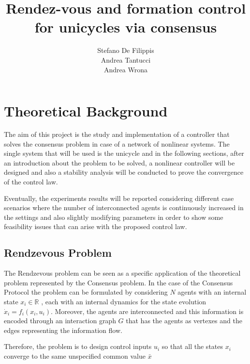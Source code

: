 \documentclass[11pt]{article}
\begin{document}
\title{\textbf{\textcolor{sapred}{Rendez-vous and formation control for unicycles via consensus}}}
\author{Stefano De Filippis \\
Andrea Tantucci \\
Andrea Wrona}
\maketitle

\thispagestyle{empty}

\section*{Theoretical Background}
The aim of this project is the study and implementation of a controller that solves the consensus problem in case of a network of nonlinear systems. The single system that will be used is the unicycle and in the following sections, after an introduction about the problem to be solved, a nonlinear controller will be designed and also a stability analysis will be conducted to prove the convergence of the control law.

Eventually, the experiments results will be reported considering different case scenarios where the number of interconnected agents is continuously increased in the settings and also slightly modifying parameters in order to show some feasibility issues that can arise with the proposed control law.

\subsection*{Rendzevous Problem}

The Rendzevous problem can be seen as a specific application of the theoretical problem represented by the Consensus problem. In the case of the Consensus Protocol the problem can be formulated by considering $N$ agents with an internal state $x_i \in \mathbb{R}$ , each with an internal dynamics for the state evolution $\dot{x}_i = f_i(x_i,u_i)$. Moreover, the agents are interconnected and this information is encoded through an interaction graph $G$ that has the agents as vertexes and the edges representing the information flow.

Therefore, the problem is to design control inputs $u_i$ so that all the states $x_i$ converge to the same unspecified common value $\bar{x}$
\end{document}
